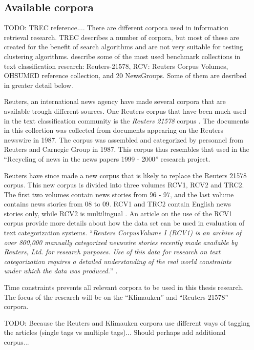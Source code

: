 \subsection{Available corpora}
TODO: TREC reference....
There are different corpora used in information retrieval research. TREC describes a number of corpora, but most of these are created for the benefit of search algorithms and are not very suitable for testing clustering algorithms. \citeauthor{Baeza-Yates2011a} describe some of the most used benchmark collections in text classification research: Reuters-21578, RCV: Reuters Corpus Volumes, OHSUMED reference collection, and 20 NewsGroups. Some of them are desribed in greater detail below.

Reuters, an international news agency have made several corpora that are available trough different sources. One Reuters corpus that have been much used in the text classification community is the \textit{Reuters 21578} corpus \cite{Lewis2004a}. The documents in this collection was collected from documents appearing on the Reuters newswire in 1987. The corpus was assembled and categorized by personnel from Reuters and Carnegie Group in 1987. This corpus thus resembles that used in the ``Recycling of news in the news papers 1999 - 2000'' research project.

Reuters have since made a new corpus that is likely to replace the Reuters 21578 corpus. This new corpus is divided into three volumes RCV1, RCV2 and TRC2. The first two volumes contain news stories from 96 - 97, and the last volume contains news stories from 08 to 09. RCV1 and TRC2 contain English news stories only, while RCV2 is multilingual \cite{NationalInstituteofStandardsandTechnology2004}. An article on the use of the RCV1 corpus provide more details about how the data set can be used in evaluation of text categorization systems. ``\textit{Reuters CorpusVolume I (RCV1) is an archive of over 800,000 manually categorized newswire stories recently made available by Reuters, Ltd. for research purposes. Use of this data for research on text categorization requires a detailed understanding of the real world constraints under which the data was produced.}'' \cite{Lewis2004}. 

Time constraints prevents all relevant corpora to be used in this thesis research. The focus of the research will be on the ``Klimauken'' and ``Reuters 21578'' corpora. 

TODO: Because the Reuters and Klimauken corpora use different ways of tagging the articles (single tags vs multiple tags)... Should perhaps add additional corpus...


